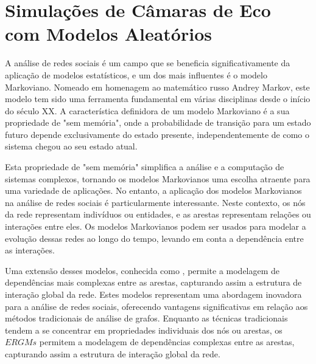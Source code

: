 \section{Simulações de Câmaras de Eco com Modelos Aleatórios}

A análise de redes sociais é um campo que se beneficia significativamente da aplicação de modelos estatísticos, e um dos mais influentes é o modelo Markoviano. Nomeado em homenagem ao matemático russo Andrey Markov, este modelo tem sido uma ferramenta fundamental em várias disciplinas desde o início do século XX. A característica definidora de um modelo Markoviano é a sua propriedade de "sem memória", onde a probabilidade de transição para um estado futuro depende exclusivamente do estado presente, independentemente de como o sistema chegou ao seu estado atual.

Esta propriedade de "sem memória" simplifica a análise e a computação de sistemas complexos, tornando os modelos Markovianos uma escolha atraente para uma variedade de aplicações. No entanto, a aplicação dos modelos Markovianos na análise de redes sociais é particularmente interessante. Neste contexto, os nós da rede representam indivíduos ou entidades, e as arestas representam relações ou interações entre eles. Os modelos Markovianos podem ser usados para modelar a evolução dessas redes ao longo do tempo, levando em conta a dependência entre as interações.

Uma extensão desses modelos, conhecida como , permite a modelagem de dependências mais complexas entre as arestas, capturando assim a estrutura de interação global da rede. Estes modelos representam uma abordagem inovadora para a análise de redes sociais, oferecendo vantagens significativas em relação aos métodos tradicionais de análise de grafos. Enquanto as técnicas tradicionais tendem a se concentrar em propriedades individuais dos nós ou arestas, os $ERGMs$ permitem a modelagem de dependências complexas entre as arestas, capturando assim a estrutura de interação global da rede.

